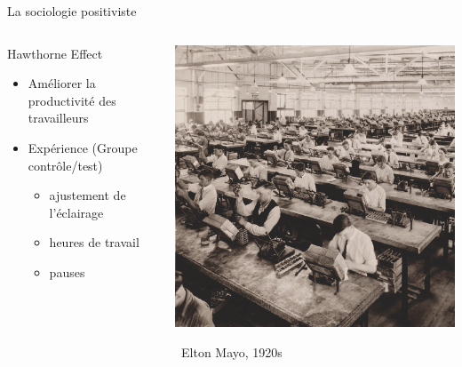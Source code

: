 \documentclass[10pt]{beamer}
\begin{document}
\begin{frame}{La sociologie positiviste}
    \begin{columns}
        \begin{column}{0.5\textwidth}
            \begin{block}{Hawthorne Effect}
                \begin{itemize}
                    \item[\faBullseye] Améliorer la productivité des travailleurs
                    \item[\faVials] Expérience (Groupe contrôle/test)
                            \begin{itemize}
                                \item ajustement de l'éclairage
                                \item heures de travail
                                \item pauses
                            \end{itemize}
                \end{itemize}
            \end{block}
        \end{column}
    \begin{column}{0.5\textwidth}
        \includegraphics[width=\textwidth]{hawthorne}
        \begin{flushright}
            \small~Elton Mayo, 1920s
        \end{flushright}
    \end{column}
    \end{columns}
\end{frame}
\end{document}
